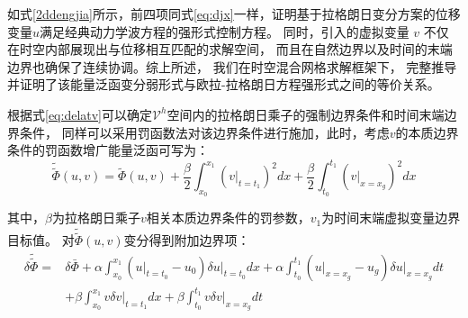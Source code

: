 如式\eqref{2ddengjia}所示，前四项同式\eqref{eq:djx}一样，证明基于拉格朗日变分方案的位移变量$u$满足经典动力学波方程的强形式控制方程。
同时，引入的虚拟变量 $v$ 不仅在时空内部展现出与位移相互匹配的求解空间，
而且在自然边界以及时间的末端边界也确保了连续协调。综上所述，
我们在时空混合网格求解框架下，
完整推导并证明了该能量泛函变分弱形式与欧拉-拉格朗日方程强形式之间的等价关系。

根据式\eqref{eq:delatv}可以确定$\mathcal{V}^h$空间内的拉格朗日乘子的强制边界条件和时间末端边界条件，
同样可以采用罚函数法对该边界条件进行施加，此时，考虑$v$的本质边界条件的罚函数增广能量泛函可写为：
\begin{equation}
\tilde{\tilde{\Phi}}(u,v) = \tilde{\Phi}(u,v)
+ \frac{\beta}{2}\int_{x_0}^{x_1} \left(v \vert_{t=t_1}\right)^2 dx
+ \frac{\beta}{2}\int_{t_0}^{t_1} \left(v\vert_{x=x_g}\right)^2 dx
\end{equation}

其中，$\beta$为拉格朗日乘子$v$相关本质边界条件的罚参数，$v_1$为时间末端虚拟变量边界目标值。
对$\tilde{\tilde{\Phi}}(u,v)$变分得到附加边界项：
\begin{equation}
    \begin{aligned}
        \delta \tilde{\tilde{\Phi}} =& \delta \bar{\Phi}
        + \alpha\int_{x_0}^{x_1} \left(u \vert_{t=t_0}-u_0\right) \delta u \vert_{t=t_0} dx
        + \alpha\int_{t_0}^{t_1} \left(u\vert_{x=x_g}-u_g\right) \delta u \vert_{x=x_g} dt  \\ 
        &+ \beta\int_{x_0}^{x_1} v \delta v \vert_{t=t_1} dx
        + \beta\int_{t_0}^{t_1}  v \delta v \vert_{x=x_g} dt
    \end{aligned}
\end{equation}


